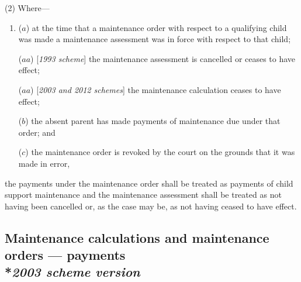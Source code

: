 \documentclass[12pt,a4paper]{article}
\begin{document}
(2) Where—
\begin{enumerate}\item[]
($a$) at the time that a maintenance order with respect to a qualifying child was made a maintenance assessment was in force with respect to that child;

($aa$) [\emph{1993 scheme}] the maintenance assessment is cancelled or ceases to have effect;

($aa$) [\emph{2003 and 2012 schemes}] the maintenance 
calculation
ceases to have effect;

($b$) the absent parent has made payments of maintenance due under that order; and

($c$) the maintenance order is revoked by the court on the grounds that it was made in error,
\end{enumerate}
the payments under the maintenance order shall be treated as payments of child support maintenance and the maintenance assessment shall be treated as not having been cancelled or, as the case may be,
as not having ceased to have effect. %


\subsection[8A. Maintenance calculations and maintenance orders --- payments --- \emph{2003 scheme version}]{\sloppy Maintenance calculations and maintenance orders --- payments\\*\emph{2003 scheme version}}
\end{document}
